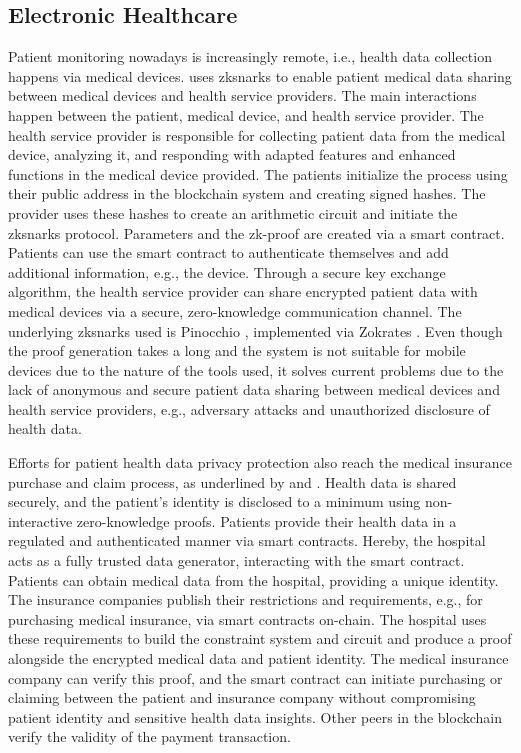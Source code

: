\subsection{Electronic Healthcare}
Patient monitoring nowadays is increasingly remote, i.e., health data collection happens via medical devices. \citet{LuongPark} uses \acrshort{zksnark}s to enable patient medical data sharing between medical devices and health service providers. The main interactions happen between the patient, medical device, and health service provider. The health service provider is responsible for collecting patient data from the medical device, analyzing it, and responding with adapted features and enhanced functions in the medical device provided. The patients initialize the process using their public address in the blockchain system and creating signed hashes. The provider uses these hashes to create an arithmetic circuit and initiate the \acrshort{zksnark}s protocol. Parameters and the zk-proof are created via a smart contract. Patients can use the smart contract to authenticate themselves and add additional information, e.g., the device. Through a secure key exchange algorithm, the health service provider can share encrypted patient data with medical devices via a secure, zero-knowledge communication channel. The underlying \acrshort{zksnark}s used is Pinocchio \citep{Pinocchio}, implemented via Zokrates \citep{ZoKrates}. Even though the proof generation takes a long and the system is not suitable for mobile devices due to the nature of the tools used, it solves current problems due to the lack of anonymous and secure patient data sharing between medical devices and health service providers, e.g., adversary attacks and unauthorized disclosure of health data.

Efforts for patient health data privacy protection also reach the medical insurance purchase and claim process, as underlined by \citet{ZHENG} and \citet{WangEtAl}. Health data is shared securely, and the patient's identity is disclosed to a minimum using non-interactive zero-knowledge proofs. Patients provide their health data in a regulated and authenticated manner via smart contracts. Hereby, the hospital acts as a fully trusted data generator, interacting with the smart contract. Patients can obtain medical data from the hospital, providing a unique identity. The insurance companies publish their restrictions and requirements, e.g., for purchasing medical insurance, via smart contracts on-chain. The hospital uses these requirements to build the constraint system and circuit and produce a proof alongside the encrypted medical data and patient identity. The medical insurance company can verify this proof, and the smart contract can initiate purchasing or claiming between the patient and insurance company without compromising patient identity and sensitive health data insights. Other peers in the blockchain verify the validity of the payment transaction.

